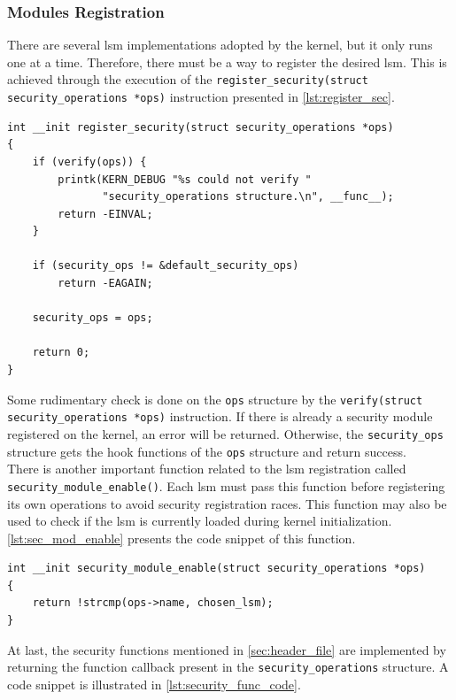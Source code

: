 \subsubsection{Modules Registration}
There are several \gls{lsm} implementations adopted by the kernel, but it only runs one at a time. Therefore, there must be a way to register the desired \gls{lsm}. This is achieved through the execution of the \texttt{register\_security(struct security\_operations *ops)} instruction presented in \autoref{lst:register_sec}.

\begin{lstlisting}[caption=Code snippet of the \texttt{register\_security()} function (Linux kernel v3.11), label=lst:register_sec]
int __init register_security(struct security_operations *ops)
{
	if (verify(ops)) {
		printk(KERN_DEBUG "%s could not verify "
		       "security_operations structure.\n", __func__);
		return -EINVAL;
	}

	if (security_ops != &default_security_ops)
		return -EAGAIN;

	security_ops = ops;

	return 0;
}
\end{lstlisting}

Some rudimentary check is done on the \texttt{ops} structure by the \texttt{verify(struct security\_operations *ops)} instruction. If there is already a security module registered on the kernel, an error will be returned. Otherwise, the \texttt{security\_ops} structure gets the hook functions of the \texttt{ops}  structure and return success.\\

There is another important function related to the \gls{lsm} registration called \texttt{security\_module\_enable()}. Each \gls{lsm} must pass this function before registering its own operations to avoid security registration races. This function may also be used to check if the \gls{lsm} is currently loaded during kernel initialization. \autoref{lst:sec_mod_enable} presents the code snippet of this function.

\begin{lstlisting}[caption=Code snippet of the \texttt{security\_module\_enable()} function (Linux kernel v3.11), label=lst:sec_mod_enable]
int __init security_module_enable(struct security_operations *ops)
{
	return !strcmp(ops->name, chosen_lsm);
}
\end{lstlisting}

At last, the security functions mentioned in \autoref{sec:header_file} are implemented by returning the function callback present in the \texttt{security\_operations} structure. A code snippet is illustrated in \autoref{lst:security_func_code}.

